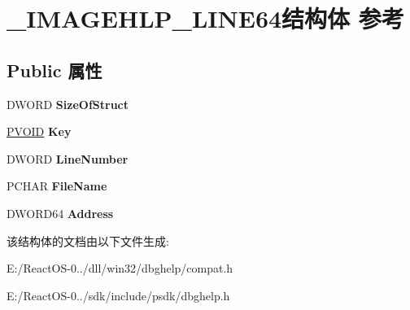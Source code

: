 \hypertarget{struct___i_m_a_g_e_h_l_p___l_i_n_e64}{}\section{\+\_\+\+I\+M\+A\+G\+E\+H\+L\+P\+\_\+\+L\+I\+N\+E64结构体 参考}
\label{struct___i_m_a_g_e_h_l_p___l_i_n_e64}
\subsection*{Public 属性}
\begin{DoxyCompactItemize}
\item 
\mbox{\label{struct___i_m_a_g_e_h_l_p___l_i_n_e64_add67362ebbf03475b285efcb2573d0ef}} 
D\+W\+O\+RD {\bfseries Size\+Of\+Struct}
\item 
\mbox{\label{struct___i_m_a_g_e_h_l_p___l_i_n_e64_af7ebc5313c21bb8ec404025137c8543e}} 
\hyperlink{interfacevoid}{P\+V\+O\+ID} {\bfseries Key}
\item 
\mbox{\label{struct___i_m_a_g_e_h_l_p___l_i_n_e64_ad382f0cffcbbeadef43b548121ef3000}} 
D\+W\+O\+RD {\bfseries Line\+Number}
\item 
\mbox{\label{struct___i_m_a_g_e_h_l_p___l_i_n_e64_a8a429f2428ba376b987da9d9fac583a8}} 
P\+C\+H\+AR {\bfseries File\+Name}
\item 
\mbox{\label{struct___i_m_a_g_e_h_l_p___l_i_n_e64_a314ba60c59baa569b187137141864a6f}} 
D\+W\+O\+R\+D64 {\bfseries Address}
\end{DoxyCompactItemize}


该结构体的文档由以下文件生成\+:\begin{DoxyCompactItemize}
\item 
E\+:/\+React\+O\+S-\/0../dll/win32/dbghelp/compat.\+h\item 
E\+:/\+React\+O\+S-\/0../sdk/include/psdk/dbghelp.\+h\end{DoxyCompactItemize}
